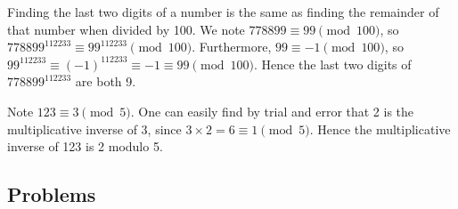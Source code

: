 \begin{questions}
    \item Finding the last two digits of a number is the same as finding the remainder of that number when divided by 100. We note $778899 \equiv 99 \pmod{100}$, so $778899^{112233} \equiv 99^{112233} \pmod{100}$. Furthermore, $99 \equiv -1 \pmod{100}$, so $99^{112233}\equiv (-1)^{112233} \equiv -1 \equiv 99 \pmod{100}$. Hence the last two digits of $778899^{112233}$ are both 9.

    \item Note $123 \equiv 3 \pmod 5$. One can easily find by trial and error that 2 is the multiplicative inverse of 3, since $3 \times 2 = 6 \equiv 1 \pmod 5$. Hence the multiplicative inverse of 123 is 2 modulo 5.
\end{questions}

\subsection*{Problems}
